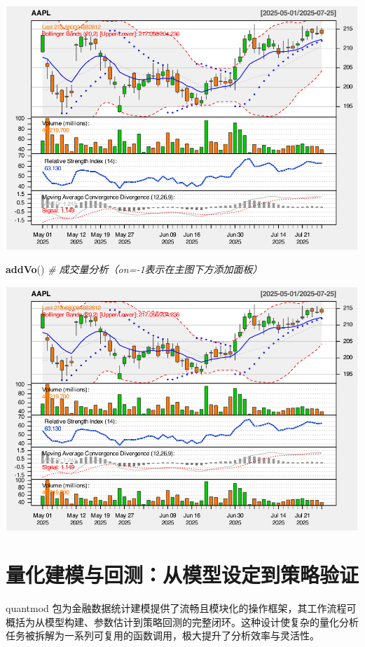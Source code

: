 \documentclass[]{ctexbook}
\newenvironment{Shaded}{\begin{snugshade}}{\end{snugshade}}
\newcommand{\CommentTok}[1]{\textcolor[rgb]{0.56,0.35,0.01}{\textit{#1}}}
\newcommand{\FunctionTok}[1]{\textcolor[rgb]{0.13,0.29,0.53}{\textbf{#1}}}
\newcommand{\NormalTok}[1]{#1}
\begin{document}
\includegraphics[width=0.9\linewidth]{QuantmodHandbook_files/figure-latex/comprehensive-7}

\begin{Shaded}
\begin{Highlighting}[]
\FunctionTok{addVo}\NormalTok{()  }\CommentTok{\# 成交量分析（on={-}1表示在主图下方添加面板）}
\end{Highlighting}
\end{Shaded}

\includegraphics[width=0.9\linewidth]{QuantmodHandbook_files/figure-latex/comprehensive-8}

\chapter{量化建模与回测：从模型设定到策略验证}\label{model}

quantmod 包为金融数据统计建模提供了流畅且模块化的操作框架，其工作流程可概括为从模型构建、参数估计到策略回测的完整闭环。这种设计使复杂的量化分析任务被拆解为一系列可复用的函数调用，极大提升了分析效率与灵活性。
\end{document}

